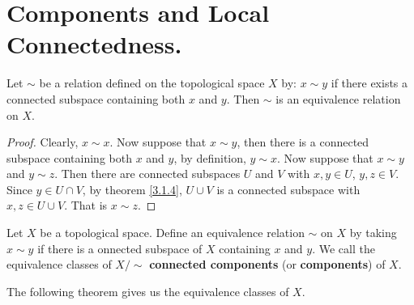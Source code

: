
\section{Components and Local Connectedness.}

\begin{proposition}\label{3.3.1}
    Let $\sim$ be a relation defined on the topological space  $X$ by:  $x \sim y$ if there exists a
    connected subspace containing both  $x$ and  $y$. Then $\sim$ is an equivalence relation on
    $X$.
\end{proposition}
\begin{proof}
    Clearly, $x \sim x$. Now suppose that  $x \sim y$, then there is a connected subspace containing
    both  $x$ and  $y$, by definition,  $y \sim x$. Now suppose that  $x \sim y$ and  $y \sim z$.
    Then there are connected subspaces  $U$ and  $V$ with  $x,y \in U$,  $y,z \in V$. Since $y \in U
    \cap V$, by theorem \ref{3.1.4}, $U \cup V$ is a connected subspace with  $x,z \in U \cup V$.
    That is  $x \sim z$.
\end{proof}

\begin{definition}
    Let $X$ be a topological space. Define an equivalence relation  $\sim$ on  $X$ by taking  $x
    \sim y$ if there is a onnected subspace of  $X$ containing  $x$ and  $y$. We call the
    equivalence classes of  $X/\sim$  \textbf{connected components} (or \textbf{components}) of
    $X$.
\end{definition}

The following theorem gives us the equivalence classes of $X$.

